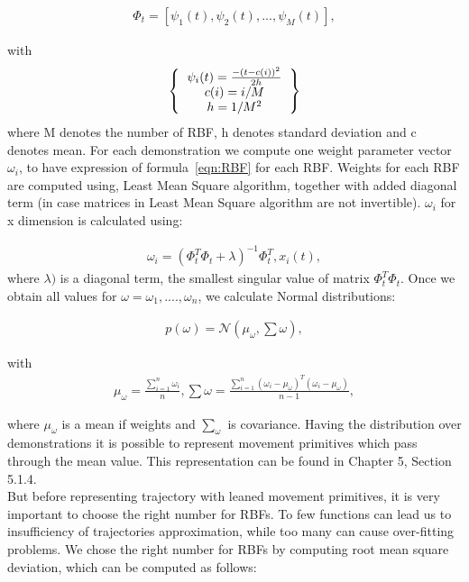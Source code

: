 \begin{equation}
\begin{split}
\Phi_{t} = \displaystyle [\psi_{1}(t), \psi_{2}(t), ..., \psi_{M}(t)], 
\end{split}
\label{eqn:RBF}
\end{equation}

with
\[ 
\left \{
\begin{tabular}{ccc}
$ \psi_{i}(t) = \frac{-(t - c(i))^2}{2h} $ \\
$ c(i) = i/M $ \\
$ h = 1/M^2 $ 
\end{tabular}
\right \}
\] 
where M denotes the number of \gls{RBF}, h denotes standard deviation and c denotes mean.
For each demonstration we compute one weight parameter vector $\omega_{i}$, to have expression of formula~\ref{eqn:RBF} for each \gls{RBF}. Weights for each \gls{RBF} are computed using, Least Mean Square algorithm, together with added diagonal term (in case matrices in Least Mean Square algorithm are not invertible). $\omega_{i}$ for x dimension is calculated using:

\begin{equation}
\begin{split}
\omega_{i} = \displaystyle (\Phi_{t}^T \Phi_{t} + \lambda)^{-1} \Phi_{t}^T,  x_{i}(t), 
\end{split}
\label{eqn:RBF}
\end{equation}
where $\lambda)$ is a diagonal term, the smallest singular value of matrix $\Phi_{t}^T \Phi_{t}$. 
Once we obtain all values for $\omega = {\omega_{1}, .... , \omega_{n}}$, we calculate Normal distributions:

\begin{equation}
\begin{split}
p(\omega) = \displaystyle \mathcal{N}(\mu_{\omega}, \sum{\omega}), 
\end{split}
\label{eqn:123}
\end{equation}

with
\begin{equation}
\begin{split}
\mu_{\omega} = \displaystyle \frac{\sum_{i=1}^{n}\omega_{i}}{n},  \sum{\omega} = \displaystyle \frac{\sum_{i=1}^{n} (\omega_{i} - \mu_{\omega})^T (\omega_{i} - \mu_{\omega}) }{n-1},
\end{split}
\label{eqn:01}
\end{equation}
 
where $\mu_{\omega}$ is a mean if weights and $\sum_{\omega}$ is covariance.
Having the distribution over demonstrations it is possible to represent movement primitives which pass through the mean value. This representation can be found in Chapter 5, Section 5.1.4. \\
But before representing trajectory with leaned movement primitives, it is very important to choose the right number for \glspl{RBF}. To few functions can lead us to insufficiency of trajectories approximation, while too many can cause over-fitting problems. We chose the right number for \glspl{RBF} by computing root mean square deviation, which can be computed as follows:


